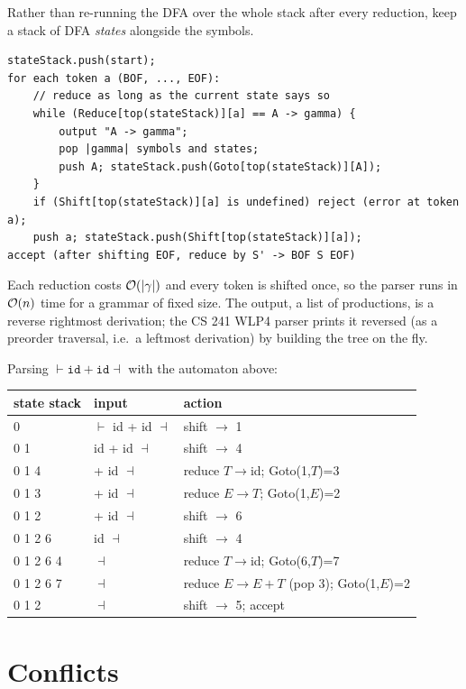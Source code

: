 Rather than re-running the DFA over the whole stack after every reduction, keep a stack of
DFA \emph{states} alongside the symbols.

\begin{lstlisting}[style=cpp]
stateStack.push(start);
for each token a (BOF, ..., EOF):
    // reduce as long as the current state says so
    while (Reduce[top(stateStack)][a] == A -> gamma) {
        output "A -> gamma";
        pop |gamma| symbols and states;
        push A; stateStack.push(Goto[top(stateStack)][A]);
    }
    if (Shift[top(stateStack)][a] is undefined) reject (error at token a);
    push a; stateStack.push(Shift[top(stateStack)][a]);
accept (after shifting EOF, reduce by S' -> BOF S EOF)
\end{lstlisting}

Each reduction costs $\mathcal{O}(|\gamma|)$ and every token is shifted once, so the parser runs in
$\mathcal{O}(n)$ time for a grammar of fixed size. The output, a list of productions, is a reverse
rightmost derivation; the CS 241 WLP4 parser prints it reversed (as a preorder traversal,
i.e.\ a leftmost derivation) by building the tree on the fly.

\begin{example}
Parsing $\vdash \mathtt{id}+\mathtt{id}\dashv$ with the automaton above:
\begin{center}
\small
\begin{tabular}{lll}
\toprule
state stack & input & action \\
\midrule
0 & $\vdash$ id + id $\dashv$ & shift $\to$ 1 \\
0 1 & id + id $\dashv$ & shift $\to$ 4 \\
0 1 4 & + id $\dashv$ & reduce $T\to$id; Goto(1,$T$)=3 \\
0 1 3 & + id $\dashv$ & reduce $E\to T$; Goto(1,$E$)=2 \\
0 1 2 & + id $\dashv$ & shift $\to$ 6 \\
0 1 2 6 & id $\dashv$ & shift $\to$ 4 \\
0 1 2 6 4 & $\dashv$ & reduce $T\to$id; Goto(6,$T$)=7 \\
0 1 2 6 7 & $\dashv$ & reduce $E\to E+T$ (pop 3); Goto(1,$E$)=2 \\
0 1 2 & $\dashv$ & shift $\to$ 5; accept \\
\bottomrule
\end{tabular}
\end{center}
\end{example}

\section{Conflicts}

